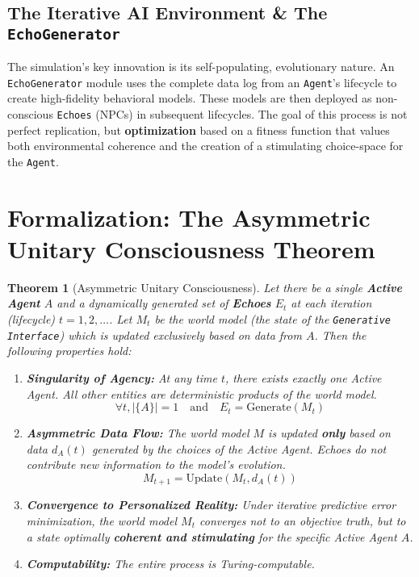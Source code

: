 \documentclass[12pt, a4paper]{article}
\newtheorem{theorem}{Theorem}
\begin{document}
	\subsection{The Iterative AI Environment \& The \texttt{EchoGenerator}}
	
	The simulation's key innovation is its self-populating, evolutionary nature. An \texttt{EchoGenerator} module uses the complete data log from an \texttt{Agent}'s lifecycle to create high-fidelity behavioral models. These models are then deployed as non-conscious \texttt{Echoes} (NPCs) in subsequent lifecycles. The goal of this process is not perfect replication, but \textbf{optimization} based on a fitness function that values both environmental coherence and the creation of a stimulating choice-space for the \texttt{Agent}.
	
	\section{Formalization: The Asymmetric Unitary Consciousness Theorem}
	
	\begin{theorem}[Asymmetric Unitary Consciousness]
		Let there be a single \textbf{Active Agent} $A$ and a dynamically generated set of \textbf{Echoes} $E_t$ at each iteration (lifecycle) $t=1, 2, \dots$. Let $M_t$ be the world model (the state of the \texttt{Generative Interface}) which is updated exclusively based on data from $A$. Then the following properties hold:
		\begin{enumerate}
			\item \textbf{Singularity of Agency:} At any time $t$, there exists exactly one Active Agent. All other entities are deterministic products of the world model.
			\[ \forall t, |\{A\}| = 1 \quad \text{and} \quad E_t = \text{Generate}(M_t) \]
			\item \textbf{Asymmetric Data Flow:} The world model $M$ is updated \textbf{only} based on data $d_A(t)$ generated by the choices of the Active Agent. Echoes do not contribute new information to the model's evolution.
			\[ M_{t+1} = \text{Update}(M_t, d_A(t)) \]
			\item \textbf{Convergence to Personalized Reality:} Under iterative predictive error minimization, the world model $M_t$ converges not to an objective truth, but to a state optimally \textbf{coherent and stimulating} for the specific Active Agent $A$.
			\item \textbf{Computability:} The entire process is Turing-computable.
		\end{enumerate}
	\end{theorem}
	
\end{document}
